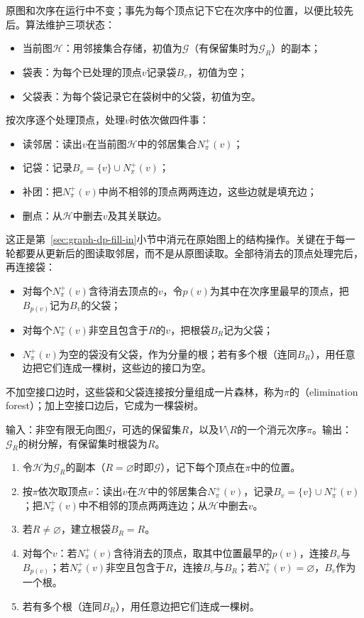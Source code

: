 原图和次序在运行中不变；事先为每个顶点记下它在次序中的位置，以便比较先后。算法维护三项状态：
\begin{itemize}
  \item 当前图$\mathcal H$：用邻接集合存储，初值为$\mathcal G$（有保留集时为$\mathcal G_R$）的副本；
  \item 袋表：为每个已处理的顶点$v$记录袋$B_v$，初值为空；
  \item 父袋表：为每个袋记录它在袋树中的父袋，初值为空。
\end{itemize}
按次序逐个处理顶点，处理$v$时依次做四件事：
\begin{itemize}
  \item 读邻居：读出$v$在当前图$\mathcal H$中的邻居集合$N^+_\pi(v)$；
  \item 记袋：记录$B_v=\{v\}\cup N^+_\pi(v)$；
  \item 补团：把$N^+_\pi(v)$中尚不相邻的顶点两两连边，这些边就是填充边；
  \item 删点：从$\mathcal H$中删去$v$及其关联边。
\end{itemize}
这正是第~\ref{sec:graph-dp-fill-in}小节中消元在原始图上的结构操作。关键在于每一轮都要从更新后的图读取邻居，而不是从原图读取。全部待消去的顶点处理完后，再连接袋：
\begin{itemize}
  \item 对每个$N^+_\pi(v)$含待消去顶点的$v$，令$p(v)$为其中在次序里最早的顶点，把$B_{p(v)}$记为$B_v$的父袋；
  \item 对每个$N^+_\pi(v)$非空且包含于$R$的$v$，把根袋$B_R$记为父袋；
  \item $N^+_\pi(v)$为空的袋没有父袋，作为分量的根；若有多个根（连同$B_R$），用任意边把它们连成一棵树，这些边的接口为空。
\end{itemize}
不加空接口边时，这些袋和父袋连接按分量组成一片森林，称为$\pi$的（elimination forest）；加上空接口边后，它成为一棵袋树。

\begin{algorithm}[由消元次序构造树分解]
\label{alg:graph-dp-order-to-decomposition}
输入：非空有限无向图$\mathcal G$，可选的保留集$R$，以及$V\setminus R$的一个消元次序$\pi$。输出：$\mathcal G_R$的树分解，有保留集时根袋为$R$。
\begin{enumerate}
  \item 令$\mathcal H$为$\mathcal G_R$的副本（$R=\varnothing$时即$\mathcal G$），记下每个顶点在$\pi$中的位置。
  \item 按$\pi$依次取顶点$v$：读出$v$在$\mathcal H$中的邻居集合$N^+_\pi(v)$，记录$B_v=\{v\}\cup N^+_\pi(v)$；把$N^+_\pi(v)$中不相邻的顶点两两连边；从$\mathcal H$中删去$v$。
  \item 若$R\neq\varnothing$，建立根袋$B_R=R$。
  \item 对每个$v$：若$N^+_\pi(v)$含待消去的顶点，取其中位置最早的$p(v)$，连接$B_v$与$B_{p(v)}$；若$N^+_\pi(v)$非空且包含于$R$，连接$B_v$与$B_R$；若$N^+_\pi(v)=\varnothing$，$B_v$作为一个根。
  \item 若有多个根（连同$B_R$），用任意边把它们连成一棵树。
\end{enumerate}
\end{algorithm}


